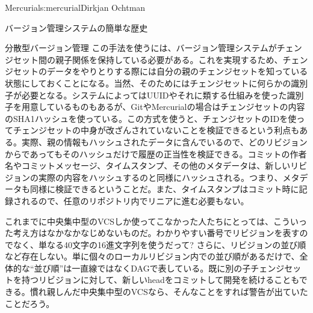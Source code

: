 \begin{aosachapter}{Mercurial}{s:mercurial}{Dirkjan Ochtman}
\begin{aosasect1}{バージョン管理システムの簡単な歴史}
\begin{aosasect2}{分散型バージョン管理}
この手法を使うには、バージョン管理システムがチェンジセット間の親子関係を保持している必要がある。これを実現するため、チェンジセットのデータをやりとりする際には自分の親のチェンジセットを知っている状態にしておくことになる。当然、そのためにはチェンジセットに何らかの識別子が必要となる。システムによってはUUIDやそれに類する仕組みを使った識別子を用意しているものもあるが、GitやMercurialの場合はチェンジセットの内容のSHA1ハッシュを使っている。この方式を使うと、チェンジセットのIDを使ってチェンジセットの中身が改ざんされていないことを検証できるという利点もある。実際、親の情報もハッシュされたデータに含んでいるので、どのリビジョンからであってもそのハッシュだけで履歴の正当性を検証できる。コミットの作者名やコミットメッセージ、タイムスタンプ、その他のメタデータは、新しいリビジョンの実際の内容をハッシュするのと同様にハッシュされる。つまり、メタデータも同様に検証できるということだ。また、タイムスタンプはコミット時に記録されるので、任意のリポジトリ内でリニアに進む必要もない。

これまでに中央集中型のVCSしか使ってこなかった人たちにとっては、こういった考え方はなかなかなじめないものだ。わかりやすい番号でリビジョンを表すのでなく、単なる40文字の16進文字列を使うだって? さらに、リビジョンの並び順など存在しない。単に個々のローカルリビジョン内での並び順があるだけで、全体的な``並び順''は一直線ではなくDAGで表している。既に別の子チェンジセットを持つリビジョンに対して、新しいheadをコミットして開発を続けることもできる。慣れ親しんだ中央集中型のVCSなら、そんなことをすれば警告が出ていたことだろう。


\end{aosasect2}
\end{aosasect1}
\end{aosachapter}
